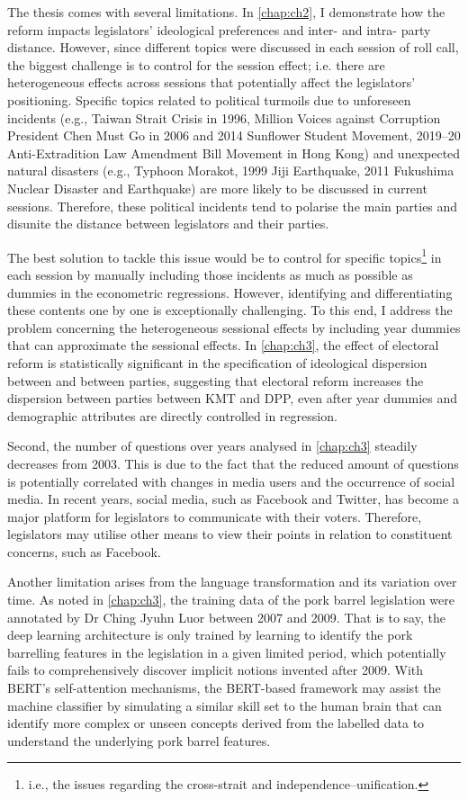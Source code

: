 The thesis comes with several limitations. In \autoref{chap:ch2}, I demonstrate how the reform impacts legislators' ideological preferences and inter- and intra- party distance. However, since different topics were discussed in each session of roll call, the biggest challenge is to control for the session effect; i.e. there are heterogeneous effects across sessions that potentially affect the legislators' positioning. Specific topics related to political turmoils due to unforeseen incidents (e.g., Taiwan Strait Crisis in 1996, Million Voices against Corruption President Chen Must Go in 2006 and 2014 Sunflower Student Movement, 2019–20 Anti-Extradition Law Amendment Bill Movement in Hong Kong) and unexpected natural disasters (e.g., Typhoon Morakot, 1999 Jiji Earthquake, 2011 Fukushima Nuclear Disaster and Earthquake) are more likely to be discussed in current sessions. Therefore, these political incidents tend to polarise the main parties and disunite the distance between legislators and their parties. 

The best solution to tackle this issue would be to control for specific topics\footnote{i.e., the issues regarding the cross-strait and independence–unification.} in each session by manually including those incidents as much as possible as dummies in the econometric regressions. However, identifying and differentiating these contents one by one is exceptionally challenging. To this end, I address the problem concerning the heterogeneous sessional effects by including year dummies that can approximate the sessional effects. In \autoref{chap:ch3}, the effect of electoral reform is statistically significant in the specification of ideological dispersion between and between parties, suggesting that electoral reform increases the dispersion between parties between KMT and DPP, even after year dummies and demographic attributes are directly controlled in regression.

Second, the number of questions over years analysed in \autoref{chap:ch3} steadily decreases from 2003. This is due to the fact that the reduced amount of questions is potentially correlated with changes in media users and the occurrence of social media. In recent years, social media, such as Facebook and Twitter, has become a major platform for legislators to communicate with their voters. Therefore, legislators may utilise other means to view their points in relation to constituent concerns, such as Facebook.

Another limitation arises from the language transformation and its variation over time. As noted in \autoref{chap:ch3}, the training data of the pork barrel legislation were annotated by Dr Ching Jyuhn Luor \citep{Luor2008, Luor2009} between 2007 and 2009. That is to say, the deep learning architecture is only trained by learning to identify the pork barrelling features in the legislation in a given limited period, which potentially fails to comprehensively discover implicit notions invented after 2009. With BERT's self-attention mechanisms, the BERT-based framework may assist the machine classifier by simulating a similar skill set to the human brain that can identify more complex or unseen concepts derived from the labelled data to understand the underlying pork barrel features.

